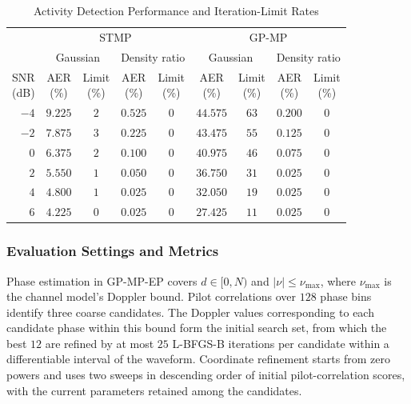 \begin{table}[!t]
\caption{Activity Detection Performance and Iteration-Limit Rates}
\label{tab:activity-evidence}
\centering
\small
\setlength{\tabcolsep}{2pt}
\begin{tabular}{@{}rcccccccc@{}}
\toprule
& \multicolumn{4}{c}{STMP}
& \multicolumn{4}{c}{GP-MP} \\
\cmidrule(lr){2-5}\cmidrule(l){6-9}
& \multicolumn{2}{c}{Gaussian} & \multicolumn{2}{c}{Density ratio}
& \multicolumn{2}{c}{Gaussian} & \multicolumn{2}{c}{Density ratio} \\
\cmidrule(lr){2-3}\cmidrule(lr){4-5}\cmidrule(lr){6-7}\cmidrule(l){8-9}
\shortstack{SNR\\(dB)} & \shortstack{AER\\(\%)} & \shortstack{Limit\\(\%)}
& \shortstack{AER\\(\%)} & \shortstack{Limit\\(\%)}
& \shortstack{AER\\(\%)} & \shortstack{Limit\\(\%)}
& \shortstack{AER\\(\%)} & \shortstack{Limit\\(\%)} \\
\midrule
$-4$ & $9.225$ & $2$ & $0.525$ & $0$ & $44.575$ & $63$ & $0.200$ & $0$ \\
$-2$ & $7.875$ & $3$ & $0.225$ & $0$ & $43.475$ & $55$ & $0.125$ & $0$ \\
$0$ & $6.375$ & $2$ & $0.100$ & $0$ & $40.975$ & $46$ & $0.075$ & $0$ \\
$2$ & $5.550$ & $1$ & $0.050$ & $0$ & $36.750$ & $31$ & $0.025$ & $0$ \\
$4$ & $4.800$ & $1$ & $0.025$ & $0$ & $32.050$ & $19$ & $0.025$ & $0$ \\
$6$ & $4.225$ & $0$ & $0.025$ & $0$ & $27.425$ & $11$ & $0.025$ & $0$ \\
\bottomrule
\end{tabular}
\end{table}

\subsubsection{Evaluation Settings and Metrics}
\label{sec:receiver-settings}
\label{sec:stopping-criteria}
Phase estimation in GP-MP-EP covers $d\in[0,N)$ and
$|\nu|\leq\nu_{\max}$, where $\nu_{\max}$ is the channel model's Doppler
bound. Pilot correlations over $128$ phase bins identify three coarse
candidates. The Doppler values corresponding to each candidate phase
within this bound form the initial search set, from which the best
$12$ are refined by at most $25$ L-BFGS-B iterations per candidate
within a differentiable interval of the waveform. Coordinate refinement
starts from zero powers and uses two sweeps in descending order of
initial pilot-correlation scores, with the current parameters retained
among the candidates.

